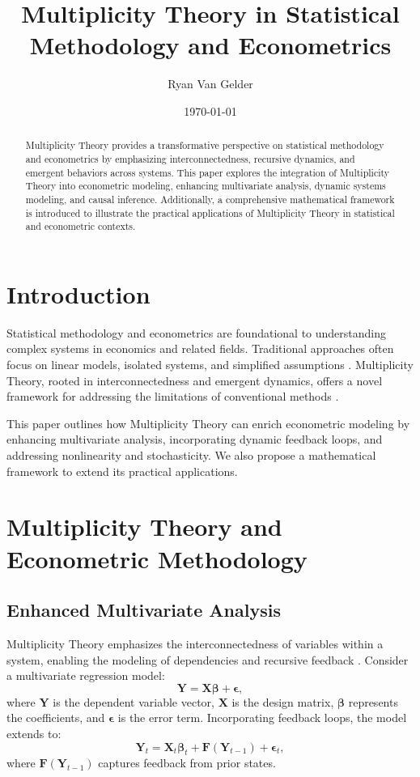 \documentclass{article}
\title{Multiplicity Theory in Statistical Methodology and Econometrics}
\author{Ryan Van Gelder}
\affil{Citizen Gardens - The Foundation of Multiplicity\\info@citizengardens.org}
\date{\today}
\theoremstyle{plain}
\begin{document}
\maketitle

\begin{abstract}
Multiplicity Theory provides a transformative perspective on statistical methodology and econometrics by emphasizing interconnectedness, recursive dynamics, and emergent behaviors across systems. This paper explores the integration of Multiplicity Theory into econometric modeling, enhancing multivariate analysis, dynamic systems modeling, and causal inference. Additionally, a comprehensive mathematical framework is introduced to illustrate the practical applications of Multiplicity Theory in statistical and econometric contexts.
\end{abstract}

\section{Introduction}
Statistical methodology and econometrics are foundational to understanding complex systems in economics and related fields. Traditional approaches often focus on linear models, isolated systems, and simplified assumptions \cite{hendry1995dynamic, wooldridge2010econometric}. Multiplicity Theory, rooted in interconnectedness and emergent dynamics, offers a novel framework for addressing the limitations of conventional methods \cite{mitchell2009complexity, barabasi2016network}.

This paper outlines how Multiplicity Theory can enrich econometric modeling by enhancing multivariate analysis, incorporating dynamic feedback loops, and addressing nonlinearity and stochasticity. We also propose a mathematical framework to extend its practical applications.

\section{Multiplicity Theory and Econometric Methodology}

\subsection{Enhanced Multivariate Analysis}
Multiplicity Theory emphasizes the interconnectedness of variables within a system, enabling the modeling of dependencies and recursive feedback \cite{bishop2006pattern, barabasi2016network}. Consider a multivariate regression model:
\begin{equation}
\mathbf{Y} = \mathbf{X}\bm{\beta} + \bm{\epsilon},
\end{equation}
where \( \mathbf{Y} \) is the dependent variable vector, \( \mathbf{X} \) is the design matrix, \( \bm{\beta} \) represents the coefficients, and \( \bm{\epsilon} \) is the error term. Incorporating feedback loops, the model extends to:
\begin{equation}
\mathbf{Y}_t = \mathbf{X}_t\bm{\beta}_t + \mathbf{F}(\mathbf{Y}_{t-1}) + \bm{\epsilon}_t,
\end{equation}
where \( \mathbf{F}(\mathbf{Y}_{t-1}) \) captures feedback from prior states.
\end{document}
